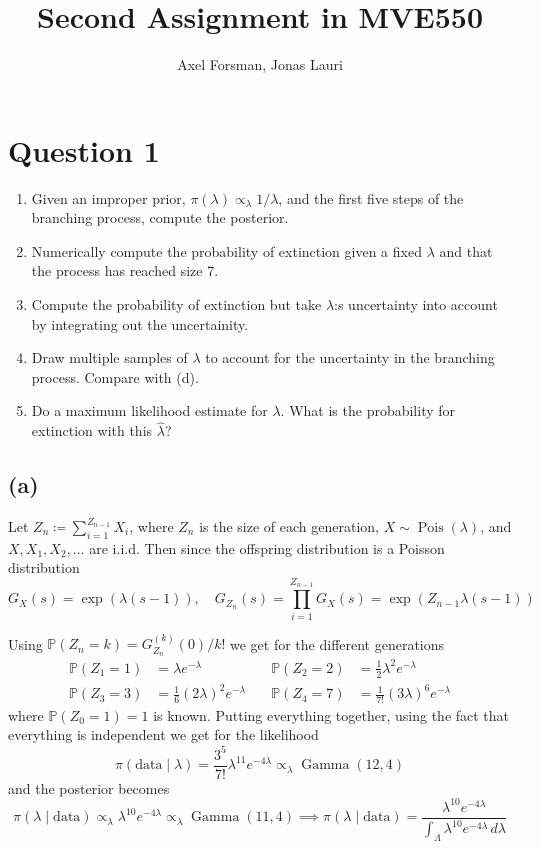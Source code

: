 \documentclass{article}
\title{Second Assignment in MVE550}
\author{Axel Forsman, Jonas Lauri}
\DeclareMathOperator\Poisson{Pois}
\DeclareMathOperator\GammaDist{Gamma}
\begin{document}
\maketitle

\section{Question 1}
\begin{enumerate}[label=(\alph*)]
\item Given an improper prior, $\pi(\lambda) \propto_{\lambda} 1/\lambda$, and the first five steps of the branching process, compute the posterior.
\item Numerically compute the probability of extinction given a fixed $\lambda$ and that the process has reached size 7.
\item Compute the probability of extinction but take $\lambda$:s uncertainty into account by integrating out the uncertainity. 
\item Draw multiple samples of $\lambda$ to account for the uncertainty in the branching process. Compare with (d).
\item Do a maximum likelihood estimate for $\lambda$. What is the probability for extinction with this $\hat\lambda$?
\end{enumerate}

\subsection{(a)}
Let $Z_n \coloneqq \sum_{i=1}^{Z_{n-1}} X_i$,
where $Z_n$ is the size of each generation,
$X \sim \Poisson(\lambda)$, and $X, X_1, X_2, \ldots$ are i.i.d.
Then since the offspring distribution is a Poisson distribution
$$ G_X(s) = \exp(\lambda (s - 1)), \quad
G_{Z_n}(s) = \prod_{i=1}^{Z_{n-1}} G_X(s) = \exp(Z_{n-1} \lambda (s - 1)) $$

Using $ \mathbb P(Z_n = k) = G_{Z_n}^{(k)}(0) / k! $
we get for the different generations
\begin{align*}
	\mathbb P(Z_1 = 1) &= \lambda e^{-\lambda} &\quad
	\mathbb P(Z_2 = 2) &= \frac12 \lambda^2 e^{-\lambda} \\
	\mathbb P(Z_3 = 3) &= \frac16 (2\lambda)^2 e^{-\lambda} &\quad
	\mathbb P(Z_4 = 7) &= \frac1{7!} (3\lambda)^6 e^{-\lambda}
\end{align*}
where $\mathbb P(Z_0 = 1) = 1$ is known.
Putting everything together,
using the fact that everything is independent we get for the likelihood
$$ \pi(\text{data} \mid \lambda) = \frac{3^5}{7!} \lambda^{11} e^{-4\lambda}
	\propto_\lambda \GammaDist(12, 4) $$
and the posterior becomes
$$ \pi(\lambda \mid \text{data}) \propto_\lambda \lambda^{10} e^{-4\lambda}
	\propto_\lambda \GammaDist(11, 4)
	\implies \pi(\lambda \mid \text{data}) = \frac{\lambda^{10} e^{-4\lambda}}{\int_\Lambda \lambda^10 e^{-4\lambda} \, d\lambda} $$
\end{document}
